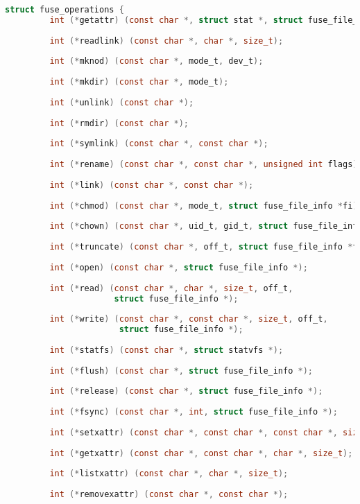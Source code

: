 \documentclass[main]{subfiles}
\begin{document}
\begin{lstlisting}[label=fuse_operations,caption=fuseの命令一覧,language=c]
 struct fuse_operations {
         int (*getattr) (const char *, struct stat *, struct fuse_file_info *fi);
 
         int (*readlink) (const char *, char *, size_t);
 
         int (*mknod) (const char *, mode_t, dev_t);
 
         int (*mkdir) (const char *, mode_t);
 
         int (*unlink) (const char *);
 
         int (*rmdir) (const char *);
 
         int (*symlink) (const char *, const char *);
 
         int (*rename) (const char *, const char *, unsigned int flags);
 
         int (*link) (const char *, const char *);
 
         int (*chmod) (const char *, mode_t, struct fuse_file_info *fi);
 
         int (*chown) (const char *, uid_t, gid_t, struct fuse_file_info *fi);
 
         int (*truncate) (const char *, off_t, struct fuse_file_info *fi);
 
         int (*open) (const char *, struct fuse_file_info *);
 
         int (*read) (const char *, char *, size_t, off_t,
                      struct fuse_file_info *);
 
         int (*write) (const char *, const char *, size_t, off_t,
                       struct fuse_file_info *);
 
         int (*statfs) (const char *, struct statvfs *);
 
         int (*flush) (const char *, struct fuse_file_info *);
 
         int (*release) (const char *, struct fuse_file_info *);
 
         int (*fsync) (const char *, int, struct fuse_file_info *);
 
         int (*setxattr) (const char *, const char *, const char *, size_t, int);
 
         int (*getxattr) (const char *, const char *, char *, size_t);
 
         int (*listxattr) (const char *, char *, size_t);
 
         int (*removexattr) (const char *, const char *);
 

\end{lstlisting}
\end{document}
